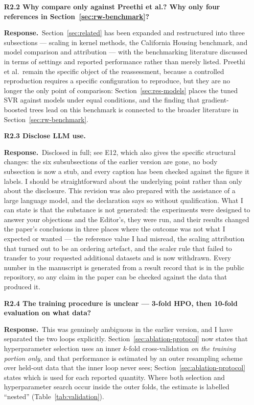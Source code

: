 \documentclass[11pt,a4paper]{article}
\newcommand{\reply}{\par\noindent\textbf{Response.}\ }
\newcommand{\pt}[1]{\par\medskip\noindent\textbf{#1}\par}
\begin{document}
\pt{R2.2 Why compare only against Preethi et al.? Why only four references in Section~\ref{sec:rw-benchmark}?}
\reply Section~\ref{sec:related} has been expanded and restructured into three subsections --- scaling in
kernel methods, the California Housing benchmark, and model comparison and attribution ---
with the benchmarking literature discussed in terms of settings and reported performance
rather than merely listed. Preethi et al.\ remain the specific object of the reassessment,
because a controlled reproduction requires a specific configuration to reproduce, but they
are no longer the only point of comparison: Section~\ref{sec:res-models} places the tuned SVR against
\NModels{} models under equal conditions, and the finding that gradient-boosted trees lead on
this benchmark is connected to the broader literature in Section~\ref{sec:rw-benchmark}.

\pt{R2.3 Disclose LLM use.}
\reply Disclosed in full; see E12, which also gives the specific structural changes: the six
subsubsections of the earlier version are gone, no body subsection is now a stub, and every
caption has been checked against the figure it labels. I should be straightforward about the
underlying point rather than only about the disclosure. This revision was also prepared with
the assistance of a large language model, and the declaration says so without qualification.
What I can state is that the substance is not generated: the experiments were designed to
answer your objections and the Editor's, they were run, and their results changed the paper's
conclusions in three places where the outcome was not what I expected or wanted --- the
reference value I had misread, the scaling attribution that turned out to be an ordering
artefact, and the scaler rule that failed to transfer to your requested additional datasets
and is now withdrawn. Every number in the manuscript is generated from a result record that
is in the public repository, so any claim in the paper can be checked against the data that
produced it.

\pt{R2.4 The training procedure is unclear --- 3-fold HPO, then 10-fold evaluation on what
data?}
\reply This was genuinely ambiguous in the earlier version, and I have separated the two
loops explicitly. Section~\ref{sec:ablation-protocol} now states that hyperparameter selection uses an inner
$k$-fold cross-validation \emph{on the training portion only}, and that performance is
estimated by an outer resampling scheme over held-out data that the inner loop never sees;
Section~\ref{sec:ablation-protocol} states which is used for each reported quantity. Where both selection and
hyperparameter search occur inside the outer folds, the estimate is labelled ``nested''
(Table~\ref{tab:validation}).
\end{document}

